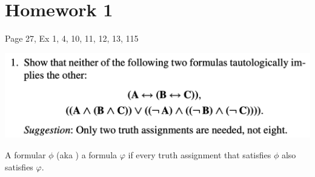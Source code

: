 \section{Homework 1}
Page 27, Ex 1, 4, 10, 11, 12, 13, 115

\includegraphics[width=400pt]{img/logic--berkeley-125a--homework-1-1a40.png}

\begin{definition}
  A formular $\phi$  (aka ) a formula $\varphi$ if every truth assignment that
  satisfies $\phi$ also satisfies $\varphi$.
\end{definition}

